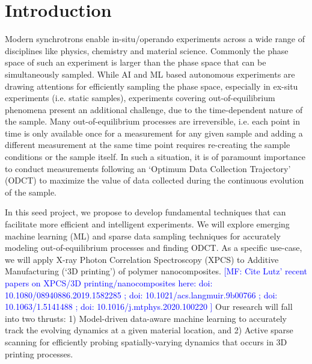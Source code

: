 \section{Introduction}
\vspace{-0.15in}


Modern synchrotrons enable in-situ/operando experiments across a wide range of disciplines like physics, chemistry and material science. Commonly the phase space of such an experiment is larger than the phase space that can be simultaneously sampled. While AI and ML based autonomous experiments are drawing attentions for efficiently sampling the phase space, especially in ex-situ experiments (i.e. static samples), 
experiments covering out-of-equilibrium phenomena present an additional challenge, due to the time-dependent nature of the sample. Many out-of-equilibrium processes are irreversible, i.e. each point in time is only available once for a measurement for any given sample and adding a different measurement at the same time point requires re-creating the sample conditions or the sample itself. In such a situation, it is of paramount importance to conduct measurements following an ‘Optimum Data Collection Trajectory’ (ODCT) to maximize the value of data collected during the continuous evolution of the sample.

In this seed project, we propose to develop fundamental techniques that can facilitate more efficient and intelligent experiments. We will explore emerging machine learning (ML) and sparse data sampling techniques for accurately modeling out-of-equilibrium processes and finding ODCT. As a specific use-case, we will apply X-ray Photon Correlation Spectroscopy (XPCS) to Additive Manufacturing (‘3D printing’) of polymer nanocomposites. 
\textcolor{blue}{[MF: Cite Lutz' recent papers on XPCS/3D printing/nanocomposites here: doi: 10.1080/08940886.2019.1582285 ; doi: 10.1021/acs.langmuir.9b00766 ; doi: 10.1063/1.5141488 ; doi: 10.1016/j.mtphys.2020.100220 ]}
Our research will fall into two thrusts: 1) Model-driven data-aware machine learning to accurately track the 
evolving dynamics at a given material location, and 2) Active sparse scanning for efficiently probing spatially-varying dynamics that occurs in 3D printing processes.

